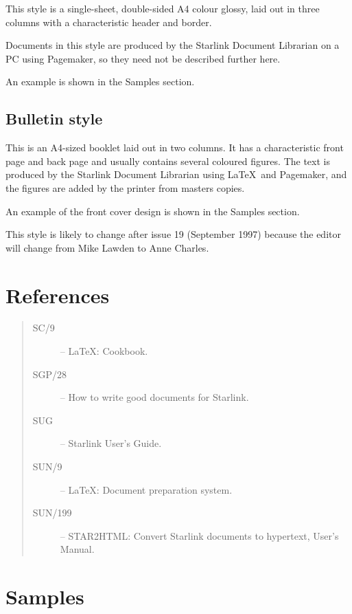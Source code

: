 \documentclass[twoside,11pt]{article}
\newcommand{\xref}[3]{#1}
\newcommand{\xlabel}[1]{}
\begin{document}
This style is a single-sheet, double-sided A4 colour glossy, laid out in three
columns with a characteristic header and border.

Documents in this style are produced by the Starlink Document Librarian on a
PC using Pagemaker, so they need not be described further here.

An example is shown in the Samples section.

\subsection{\label{bulletin_style}\xlabel{bulletin_style}Bulletin style}

This is an A4-sized booklet laid out in two columns.
It has a characteristic front page and back page and usually contains several
coloured figures.
The text is produced by the Starlink Document Librarian using \LaTeX\ and
Pagemaker, and the figures are added by the printer from masters copies.

An example of the front cover design is shown in the Samples section.

This style is likely to change after issue 19 (September 1997) because the
editor will change from Mike Lawden to Anne Charles.

\section{\label{references}\xlabel{references}References}

\begin{quote}
\begin{description}
\item [\xref{SC/9}{sc9}{}] -- \LaTeX: Cookbook.
\item [\xref{SGP/28}{sgp28}{}] -- How to write good documents for Starlink.
\item [\xref{SUG}{sug}{}] -- Starlink User's Guide.
\item [\xref{SUN/9}{sun9}{}] -- \LaTeX: Document preparation system.
\item [\xref{SUN/199}{sun199}{}] --
 STAR2HTML: Convert Starlink documents to hypertext,
User's Manual.
\end{description}
\end{quote}


\appendix

\section{\label{samples}\xlabel{samples}Samples}
\end{document}
